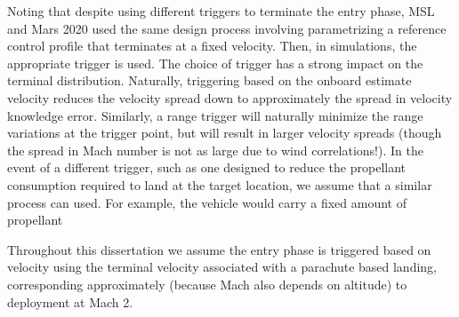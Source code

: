 Noting that despite using different triggers to terminate the entry phase, MSL and Mars 2020 used the same design process involving parametrizing a reference control profile that terminates at a fixed velocity. Then, in simulations, the appropriate trigger is used. The choice of trigger has a strong impact on the terminal distribution. Naturally, triggering based on the onboard estimate velocity reduces the velocity spread down to approximately the spread in velocity knowledge error. Similarly, a range trigger will naturally minimize the range variations at the trigger point, but will result in larger velocity spreads (though the spread in Mach number is not as large due to wind correlations!\cite{TriggerComparison2020}). In the event of a different trigger, such as one designed to reduce the propellant consumption required to land at the target location, we assume that a similar process can used. For example, the vehicle would carry a fixed amount of propellant
% 

Throughout this dissertation we assume the entry phase is triggered based on velocity using the terminal velocity associated with a parachute based landing, corresponding approximately (because Mach also depends on altitude) to deployment at Mach 2. 




